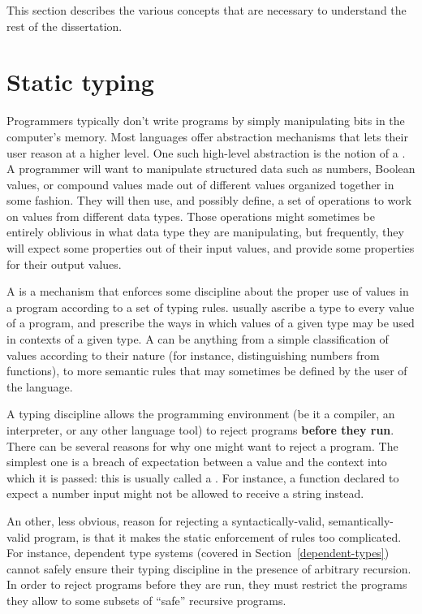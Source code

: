 This section describes the various concepts that are necessary to understand the
rest of the dissertation.

\section{Static typing}
\label{static-typing}



Programmers typically don't write programs by simply manipulating bits in the
computer's memory.  Most languages offer abstraction mechanisms that lets their
user reason at a higher level.  One such high-level abstraction is the notion of
a .  A programmer will want to manipulate structured data such
as numbers, Boolean values, or compound values made out of different values
organized together in some fashion.  They will then use, and possibly define, a
set of operations to work on values from different data types.  Those operations
might sometimes be entirely oblivious in what data type they are manipulating,
but frequently, they will expect some properties out of their input values, and
provide some properties for their output values.

A  is a mechanism that enforces some discipline about
the proper use of values in a program according to a set of typing rules.
 usually ascribe a type to every value of a program, and
prescribe the ways in which values of a given type may be used in contexts of a
given type.  A  can be anything from a simple classification of
values according to their nature (for instance, distinguishing numbers from
functions), to more semantic rules that may sometimes be defined by the user of
the language.

A  typing discipline allows the programming environment (be it a
compiler, an interpreter, or any other language tool) to reject programs
\textbf{before they run}.  There can be several reasons for why one might want
to reject a program.  The simplest one is a breach of expectation between a
value and the context into which it is passed: this is usually called a
.  For instance, a function declared to expect a number input
might not be allowed to receive a string instead.

An other, less obvious, reason for rejecting a syntactically-valid,
semantically-valid program, is that it makes the static enforcement of rules too
complicated.  For instance, dependent type systems (covered
in Section~\ref{dependent-types}) cannot safely ensure their typing discipline in the
presence of arbitrary recursion.  In order to reject programs before they are
run, they must restrict the programs they allow to some subsets of ``safe''
recursive programs.

